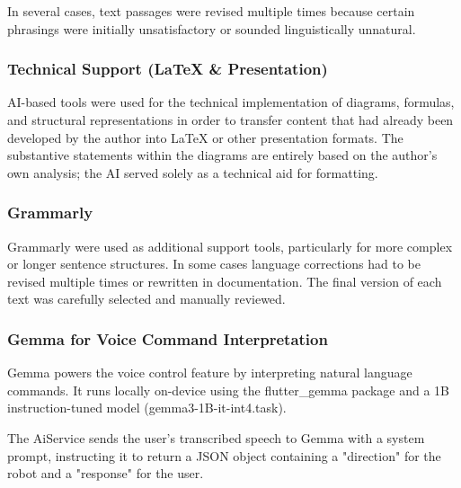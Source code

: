 \documentclass[11pt,a4paper]{article}
\begin{document}
In several cases, text passages were revised multiple times because certain phrasings were initially unsatisfactory or sounded linguistically unnatural.

\subsubsection{Technical Support (LaTeX \& Presentation)}

AI-based tools were used for the technical implementation of diagrams, formulas, and structural representations in order to transfer content that had already been developed by the author into \LaTeX{} or other presentation formats. The substantive statements within the diagrams are entirely based on the author’s own analysis; the AI served solely as a technical aid for formatting.

\subsubsection{Grammarly }

Grammarly  were used as additional support tools, particularly for more complex or longer sentence structures. In some cases language corrections had to be revised multiple times or rewritten in documentation. The final version of each text was carefully selected and manually reviewed.

\subsubsection{Gemma for Voice Command Interpretation}
Gemma powers the voice control feature by interpreting natural language commands.
It runs locally on-device using the flutter\_gemma package and a 1B instruction-tuned model (gemma3-1B-it-int4.task).

The AiService sends the user's transcribed speech to Gemma with a system prompt, instructing it to return a JSON object containing a "direction" for the robot and a "response" for the user.
\end{document}
